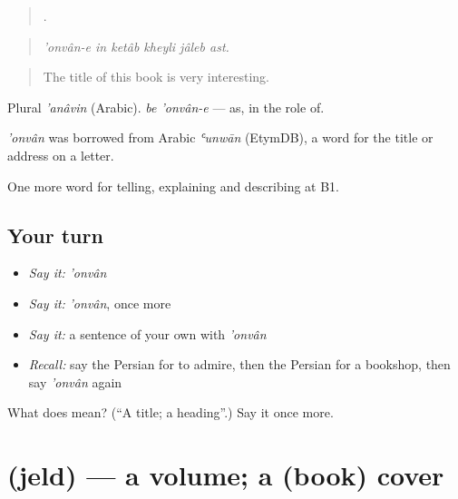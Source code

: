 \begin{quote}
     .
\end{quote}

\begin{quote}
\emph{'onvân-e in ketâb kheyli jâleb ast.}
\end{quote}

\begin{quote}
The title of this book is very interesting.
\end{quote}

Plural \emph{'anâvin} (Arabic). \emph{be 'onvân-e} — as, in the role of.

\begin{cousinweb}
\emph{'onvân} was borrowed from Arabic \emph{ʿunwān} (EtymDB), a word for the title or address on a letter.
\end{cousinweb}

\begin{grammarlens}[title={What you've built}]
One more word for telling, explaining and describing at B1.
\end{grammarlens}

\subsection*{Your turn}
\begin{itemize}
\raggedright
  \item \emph{Say it:} \emph{'onvân}
  \item \emph{Say it:} \emph{'onvân}, once more
  \item \emph{Say it:} a sentence of your own with \emph{'onvân}
  \item \emph{Recall:} say the Persian for to admire, then the Persian for a bookshop, then say \emph{'onvân} again
\end{itemize}

\begin{tcolorbox}[breakable,colback=teal!4,colframe=teal!35!black,title={Before you move on}]
What does  mean? (\textquotedblleft{}A title; a heading\textquotedblright{}.) Say it once more.
\end{tcolorbox}
\section[\texorpdfstring{\fa{جلد} (jeld)}{جلد (jeld)}]{ (jeld) — a volume; a (book) cover}

\label{lesson:FA-C528-jeld}



